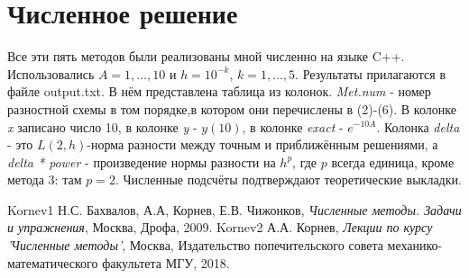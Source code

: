 \documentclass[12 pt, russian]{article}
\begin{document}
\section{Численное решение}

Все эти пять методов были реализованы мной численно на языке C++. Использовались $A = 1, \dots , 10$ и $h = 10^{-k}$, $k = 1, \dots, 5$. Результаты прилагаются в файле output.txt. В нём представлена таблица из колонок. {\it Met.num} - номер разностной схемы в том порядке,в котором они перечислены в (2)-(6). В колонке {\it x} записано число 10, в колонке {\it y} - $y(10)$, в колонке {\it exact} - $e^{-10A}$. Колонка {\it delta} - это $L(2, h)$-норма разности между точным и приближённым решениями, а {\it delta * power} - произведение нормы разности на $h^p$, где $p$ всегда единица, кроме метода 3: там $p = 2$.
Численные подсчёты подтверждают теоретические выкладки.
 


\begin{thebibliography}{100}
	\bibitem
	{Kornev1}
	Н.С. Бахвалов, А.А, Корнев, Е.В. Чижонков, {\it Численные методы. Задачи и упражнения}, Москва, Дрофа, 2009.
	\bibitem
	{Kornev2}
	А.А. Корнев, {\it Лекции по курсу 'Численные методы'}, Москва, Издательство попечительского совета механико-математического факультета МГУ, 2018.

\end{thebibliography}
\end{document}
